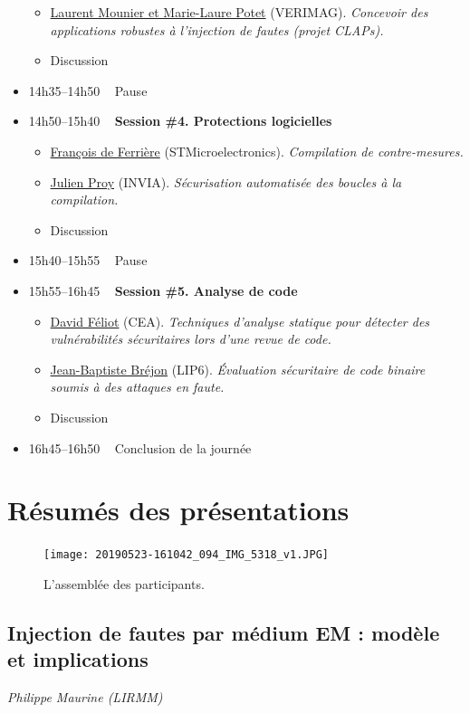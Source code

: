 \documentclass[a4paper,11pt]{article}
\begin{document}
\begin{itemize}
\begin{itemize}
\item \hyperref[sec:orgdae411e]{Laurent Mounier et Marie-Laure Potet} (VERIMAG). \emph{Concevoir des applications robustes à l’injection de fautes (projet CLAPs).}
\item Discussion
\end{itemize}
\item 14h35--14h50   Pause
\item 14h50--15h40   \textbf{Session \#4. Protections logicielles}
\begin{itemize}
\item \hyperref[sec:org0d12cbe]{François de Ferrière} (STMicroelectronics). \emph{Compilation de contre-mesures.}
\item \hyperref[sec:orgb1c5b46]{Julien Proy} (INVIA). \emph{Sécurisation automatisée des boucles à la compilation.}
\item Discussion
\end{itemize}
\item 15h40--15h55   Pause
\item 15h55--16h45   \textbf{Session \#5. Analyse de code}
\begin{itemize}
\item \hyperref[sec:org67325c8]{David Féliot} (CEA). \emph{Techniques d’analyse statique pour détecter des vulnérabilités sécuritaires lors d’une revue de code.}
\item \hyperref[sec:org90483d8]{Jean-Baptiste Bréjon} (LIP6). \emph{Évaluation sécuritaire de code binaire soumis à des attaques en faute.}
\item Discussion
\end{itemize}
\item 16h45--16h50   Conclusion de la journée
\end{itemize}

\pagebreak

\section{Résumés des présentations}
\label{sec:org6cb34c7}
\begin{figure}[t]
\centering
\texttt{[image: 20190523-161042\_094\_IMG\_5318\_v1.JPG]}
\caption{L'assemblée des participants.}
\end{figure}

\subsection{Injection de fautes par médium EM : modèle et implications}
\label{sec:orgdcb5910}
\emph{Philippe Maurine (LIRMM)}
\end{document}
